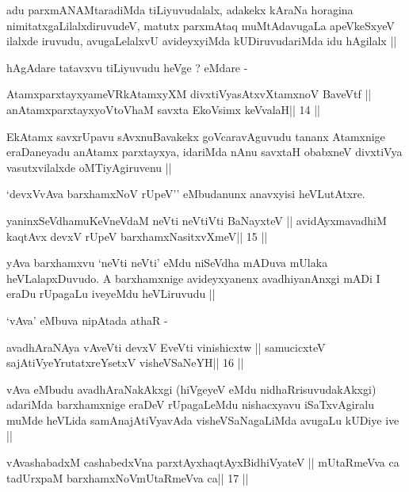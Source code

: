 \begin{artha}
adu parxmANAMtaradiMda tiLiyuvudalalx, adakekx kAraNa horagina
nimitatxgaLilalxdiruvudeV, matutx parxmAtaq muMtAdavugaLa apeVkeSxyeV
ilalxde iruvudu, avugaLelalxvU avideyxyiMda kUDiruvudariMda idu
hAgilalx ||

hAgAdare tatavxvu tiLiyuvudu heVge ? eMdare -
\end{artha}

\begin{shl}
AtamxparxtayxyameVRkAtamxyXM divxtiVyasAtxvXtamxnoV BaveVtf ||
anAtamxparxtayxyoV\s toV\s haM savxta EkoV\s simx keVvalaH\hfill || 14 ||
\end{shl}

\begin{artha}
EkAtamx savxrUpavu sAvxnuBavakekx goVcaravAguvudu tananx Atamxnige
eraDaneyadu anAtamx parxtayxya, idariMda nAnu savxtaH obabxneV
divxtiVya vasutxvilalxde oMTiyAgiruvenu || 

`devxVvAva barxhamxNoV rUpeV'' eMbudanunx anavxyisi heVLutAtxre.
\end{artha}

\begin{shl}
yaninxSeVdhamuKeVneVdaM neVti neVtiVti BaNayxteV ||
avidAyxmavadhiM kaqtAvx devxV rUpeV barxhamxNasitxvXmeV\hfill || 15 ||
\end{shl}

\begin{artha}
yAva barxhamxvu `neVti neVti' eMdu niSeVdha mADuva mUlaka
heVLalapxDuvudo. A barxhamxnige avideyxyanenx avadhiyanAnxgi mADi I
eraDu rUpagaLu iveyeMdu heVLiruvudu ||

`vAva' eMbuva nipAtada athaR -
\end{artha}

\begin{shl}
avadhAraNAya vAveVti devxV EveVti vinishicxtw ||
samucicxteV sajAtiVyeYrutatxreYsetxV visheVSaNeYH\hfill || 16 ||
\end{shl}

\begin{artha}
vAva eMbudu avadhAraNakAkxgi (hiVgeyeV eMdu nidhaRrisuvudakAkxgi)
adariMda barxhamxnige eraDeV rUpagaLeMdu nishacxyavu iSaTxvAgiralu
muMde heVLida samAnajAtiVyavAda visheVSaNagaLiMda avugaLu kUDiye ive ||
\end{artha}

\begin{shl}
vAvashabadxM cashabedxVna parxtAyxhaqtAyxBidhiVyateV ||
mUtaRmeVva ca tadUrxpaM barxhamxNoV\s mUtaRmeVva ca\hfill || 17 ||
\end{shl}

